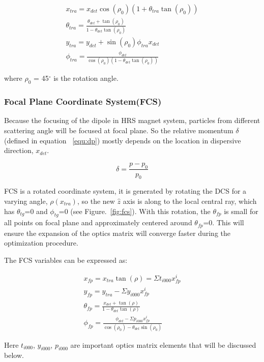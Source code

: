 \begin{align}
x_{tra}     = x_{det}\cos(\rho_0)(1+\theta_{tra}\tan(\rho_0)) \\  
\theta_{tra}= \frac{\theta_{det}+\tan(\rho_0)}{1-\theta_{det}\tan(\rho_0)} \\  
y_{tra}     = y_{det}+\sin(\rho_0)\phi_{tra}x_{det} \\ 
\phi_{tra}  = \frac{\phi_{det}}{\cos(\rho_0)(1-\theta_{det}\tan(\rho_0))}
\end{align}

where $\rho_0$ = 45$^\circ$ is the rotation angle.

\subsubsection{Focal Plane Coordinate System(FCS)}

Because the focusing of the dipole in HRS magnet system, particles
from different scattering angle will be focused at focal plane. So the
relative momentum $\delta$ (defined in equation ~\ref{equ:dp}) mostly
depends on the location in dispersive direction, $x_{det}$. 

\begin{equation}
\delta = \frac{p-p_0}{p_0}
\label{equ:dp}
\end{equation}

FCS is a rotated coordinate system,
it is generated by rotating the DCS for a varying angle, $\rho(x_{tra})$,
so the new $\hat{z}$ axis is along to the local central ray, which has
$\theta_{tg}$=0 and $\phi_{tg}$=0 (see Figure.~\ref{fig:fcs}).
With this rotation, the $\theta_{fp}$ is small for all points on focal
plane and approximately centered around $\theta_{fp}$=0.
This will ensure the expansion of the optics matrix will converge faster
during the optimization procedure.

The FCS variables can be expressed as: 

\begin{align}
x_{fp} = x_{tra}
\tan(\rho) = \Sigma t_{i000} x_{fp}^i \\
y_{fp} = y_{tra} - \Sigma y_{i000} x_{fp}^i \\
\theta_{fp} = \frac{x_{det}+\tan(\rho)}{1-\theta_{det}\tan(\rho)} \\
\phi_{fp} = \frac{\phi_{det}-\Sigma p_{i000}x_{fp}^i}{\cos(\rho_0)-\theta_{det}\sin(\rho_0)} 
\end{align}

Here $t_{i000}$, $y_{i000}$, $p_{i000}$ are important optics matrix elements
 that will be discussed below.

